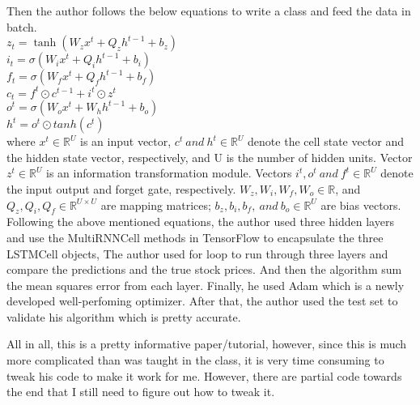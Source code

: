 \documentclass[11pt, oneside]{article}   	%
\begin{document}
\begin{Large}
Then the author follows the below equations to write a class and feed the data in batch.\\


$z_t = \tanh(W_z x^t + Q_z h^{t-1}+b_z)$\\
$i_t = \sigma(W_i x^t+Q_i h^{t-1}+b_i)$\\
$f_t = \sigma(W_f x^t+Q_f h^{t-1}+b_f)$\\
$c_t = f^t \odot c^{t-1} + i^t \odot z^t$\\
$o^t = \sigma(W_o x^t+W_h h^{t-1}+b_o)$\\
$h^t=o^t \odot tanh(c^t)$\\

where $x^t \in \mathbb{R}^U$ is an input vector, $c^t \ and\ h^t \in \mathbb{R}^U$ denote the cell state vector and the hidden state vector, respectively, and U is the number of hidden units.  Vector $z^t \in \mathbb{R}^{U}$ is an information transformation module.  Vectors $i^t, o^t \ and \ f^t \in \mathbb{R}^U$ denote the input output and forget gate, respectively. $W_z, W_i, W_f, W_o \in \mathbb{R}$, and $ Q_z, Q_i, Q_f \in \mathbb{R}^{U\times U}$ are mapping matrices; $b_z, b_i, b_f, \ and \ b_o \in \mathbb{R}^U $ are bias vectors.\\

Following the above mentioned equations, the author used three hidden layers and use the MultiRNNCell methods in TensorFlow to encapsulate the three LSTMCell objects,  The author used for loop to run through three layers and compare the predictions and the true stock prices.  And then the algorithm sum the mean squares error from each layer.  Finally, he used Adam which is a newly developed well-perfoming optimizer.  After that, the author used the test set to validate his algorithm which is pretty accurate.

All in all, this is a pretty informative paper/tutorial, however, since this is much more complicated than was taught in the class, it is very time consuming to tweak his code to make it work for me.  However, there are partial code towards the end that I still need to figure out how to tweak it.

\end{Large}
\end{document}
